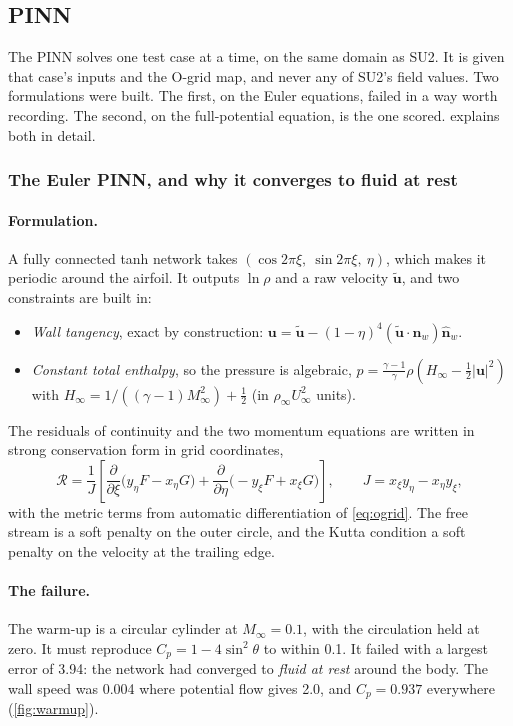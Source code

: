 \documentclass[11pt]{article}
\newcommand{\Ma}{M_\infty}
\newcommand{\Cp}{C_p}
\newcommand{\vu}{\bm{u}}
\begin{document}
\subsection{PINN}
\label{sec:pinn}

The PINN solves one test case at a time, on the same domain as SU2. It is given that case's inputs
and the O-grid map, and never any of SU2's field values. Two formulations were built. The first,
on the Euler equations, failed in a way worth recording. The second, on the full-potential
equation, is the one scored.  explains both in detail.

\subsubsection{The Euler PINN, and why it converges to fluid at rest}

\paragraph{Formulation.}
A fully connected tanh network takes $(\cos2\pi\xi,\ \sin2\pi\xi,\ \eta)$, which makes it periodic
around the airfoil. It outputs $\ln\rho$ and a raw velocity $\tilde{\vu}$, and two constraints are
built in:
\begin{itemize}
  \item \emph{Wall tangency}, exact by construction:
    $\vu = \tilde{\vu} - (1-\eta)^4(\tilde{\vu}\cdot\hat{\bm n}_w)\hat{\bm n}_w$.
  \item \emph{Constant total enthalpy}, so the pressure is algebraic,
    $p = \tfrac{\gamma-1}{\gamma}\rho(H_\infty - \tfrac12|\vu|^2)$ with
    $H_\infty = 1/((\gamma-1)\Ma^2) + \tfrac12$ (in $\rho_\infty U_\infty^2$ units).
\end{itemize}
The residuals of continuity and the two momentum equations are written in strong conservation form
in grid coordinates,
\begin{equation}
  \mathcal R = \frac1J\left[\frac{\partial}{\partial\xi}\bigl(y_\eta F - x_\eta G\bigr)
  + \frac{\partial}{\partial\eta}\bigl(-y_\xi F + x_\xi G\bigr)\right],\qquad
  J = x_\xi y_\eta - x_\eta y_\xi ,
  \label{eq:strongform}
\end{equation}
with the metric terms from automatic differentiation of \cref{eq:ogrid}. The free stream is a soft
penalty on the outer circle, and the Kutta condition a soft penalty on the velocity at the
trailing edge.

\paragraph{The failure.}
The warm-up is a circular cylinder at $\Ma = 0.1$, with the circulation held at zero. It must
reproduce $\Cp = 1 - 4\sin^2\theta$ to within 0.1. It failed with a largest error of 3.94: the
network had converged to \emph{fluid at rest} around the body. The wall speed was 0.004 where
potential flow gives 2.0, and $\Cp = 0.937$ everywhere (\cref{fig:warmup}).
\end{document}
